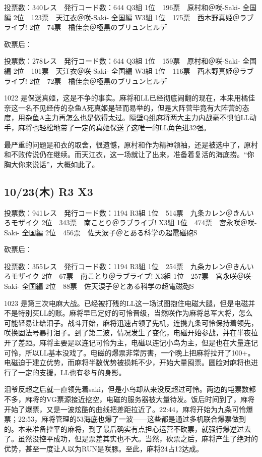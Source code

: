 	投票数：340レス　発行コード数：644
	Q3組
	1位　196票　原村和＠咲-Saki- 全国編
	2位　123票　天江衣＠咲-Saki- 全国編
	W3組
	1位　175票　西木野真姫＠ラブライブ!
	2位　74票　橘佳奈＠極黒のブリュンヒルデ

砍票后：

	投票数：278レス　発行コード数：644
	Q3組
	1位　159票　原村和＠咲-Saki- 全国編
	2位　101票　天江衣＠咲-Saki- 全国編
	W3組
	1位　116票　西木野真姫＠ラブライブ!
	2位　72票　橘佳奈＠極黒のブリュンヒルデ

1022 是保送真姬，这是不争的事实。麻将和LL已经彻底闹翻的现在，本来用橘佳奈这一名不见经传的杂鱼A死真姬是轻而易举的，但是大阵营毕竟有大阵营的态度，用杂鱼A主力再怎么也是做得太过。隔壁Q组麻将两大主力内战毫不惧怕LL动手，麻将也轻松地带了一定的真姬保送了这唯一的LL角色进32强。

最严重的问题是和衣的取舍，很遗憾，原村和作为精神领袖，还是被选中了，原村和不败传说仍在继续。而天江衣，这一场就让了出来，准备着复活的海底捞。“你胸大你来说话”，大概如此了。

\subsection{10/23(木) R3 X3}

	投票数：941レス　発行コード数：1194
	R3組
	1位　514票　九条カレン＠きんいろモザイク
	2位　343票　南ことり＠ラブライブ!
	X3組
	1位　474票　宮永咲＠咲-Saki- 全国編
	2位　456票　佐天涙子＠とある科学の超電磁砲S

砍票后：

	投票数：355レス　発行コード数：1194
	R3組
	1位　254票　九条カレン＠きんいろモザイク
	2位　67票　南ことり＠ラブライブ!
	X3組
	1位　257票　宮永咲＠咲-Saki- 全国編
	2位　88票　佐天涙子＠とある科学の超電磁砲S

1023 是第三次电麻大战。已经被打残的LL这一场试图抱住电磁大腿，但是电磁并不是特别买LL的账。麻将早已定好的可怜晋级，当然咲作为麻将总军大将，怎么可能轻易让给泪子。战斗开始，麻将迅速占领了先机，连携九条可怜保持着领先，咲换固法号暴打泪子。到了第二波，情况发生了变化，电磁开始参战，并在半夜拉开了差距。麻将主要是以连记可怜为主，电磁以连记小鸟为主，但是也在大量连记可怜，所以LL基本没戏了。电磁的爆票非常厉害，一个晚上把麻将拉开了100+。电磁迫于建立优势，而麻将半数优势被损耗不少，开始大量囤票。圆脸对麻将也进行了一定的支援，LL也有参与的身影。

泪爷反超之后就一直领先着saki，但是小鸟却从来没反超过可怜。两边的屯票数都不多，麻将的VG票源接近挖空，电磁的服务器被大量待发。饭后时间到了，麻将开始了爆票，又是一波炫酷的曲线把差距拉近了。22:44，麻将开始为九条可怜爆票；22:53，麻将管理的53海底也爆了一波——这些都是通过多机联合爆票做到的。本来准备控平的麻将，到了最后确实有点担心运营不砍票，就强行爆逆过去了。虽然没控平成功，但是票差其实也不大。当然，砍票之后，麻将产生了绝对的优势，甚至一度让人以为RUN是咲豚。至此，麻将24占12达成。

